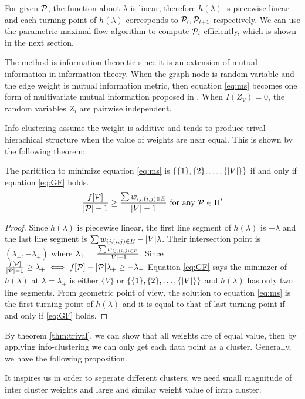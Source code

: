 \documentclass{article}
\begin{document}
For given $\P$, the function about $\lambda$ is linear, therefore $h(\lambda)$ is piecewise linear and each turning point of $h(\lambda)$ corresponds to $\P_i, \P_{i+1}$ respectively. We can use the parametric maximal flow algorithm to compute $\P_i$ efficiently, which is shown in the next section.

The method is information theoretic since it is an extension of mutual information in information theory. When the graph node is random variable and the edge weight is mutual information metric, then equation \eqref{eq:ms} becomes one form of multivariate mutual information proposed in \cite{RN1}. When $I(Z_V)=0$, the random variables $Z_i$ are pairwise independent. 

Info-clustering assume the weight is additive and tends to produce trival hierachical structure when the value of weights are near equal. This is shown by the following theorem:
\begin{theorem}\label{thm:trival}
The paritition to minimize equation \eqref{eq:ms} is $\{\{1\},\{2\},\dots,\{\abs{V}\}\}$ if and only if equation \eqref{eq:GF} holds.
\begin{equation}\label{eq:GF}
\frac{f[\P]}{\abs{\P}-1} \geq \frac{\sum w_{ij, (i,j) \in E}}{\abs{V}-1} \textrm{ for any } \P \in \Pi'
\end{equation}
\end{theorem}
\begin{proof}
Since $h(\lambda)$ is piecewise linear, the first line segment of $h(\lambda)$ is $ - \lambda $ and the last line segment is $ \sum w_{ij, (i,j) \in E} - \abs{V} \lambda$. Their intersection point is $(\lambda_{+}, -\lambda_{+})$ where $\lambda_{+} = \frac{\sum w_{ij, (i,j) \in E}}{\abs{V}-1}$. Since $\frac{f[\P]}{\abs{\P}-1} \geq \lambda_{+} \iff f[\P] - \abs{\P}\lambda_{+} \geq - \lambda_{+}$ Equation \eqref{eq:GF} says the minimzer of $h(\lambda)$ at $\lambda = \lambda_{+}$ is either $\{V\}$ or $\{\{1\},\{2\},\dots,\{\abs{V}\}\}$ and $h(\lambda)$ has only two line segments. From geometric point of view, the solution to equation \eqref{eq:ms} is the first turning point of $h(\lambda)$ and it is equal to that of last turning point if and only if \eqref{eq:GF} holds.
\end{proof}
By theorem \ref{thm:trival}, we can show that all weights are of equal value, then by applying info-clustering we can only get each data point as a cluster. Generally, we have the following proposition.

It inspires us in order to seperate different clusters, we need small magnitude of inter cluster weights and large and similar weight value of intra cluster.
\end{document}
